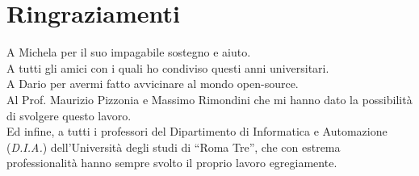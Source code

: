 \chapter*{Ringraziamenti}

A Michela per il suo impagabile sostegno e aiuto.\\
A tutti gli amici con i quali ho condiviso questi anni universitari.\\
A Dario per avermi fatto avvicinare al mondo open-source.\\
Al Prof. Maurizio Pizzonia e Massimo Rimondini che mi hanno dato la possibilità di svolgere questo lavoro.\\
Ed infine, a tutti i professori del Dipartimento di Informatica e Automazione (\emph{D.I.A.}) dell'Università degli studi di ``Roma Tre'', che con estrema professionalità hanno sempre svolto il proprio lavoro egregiamente.
